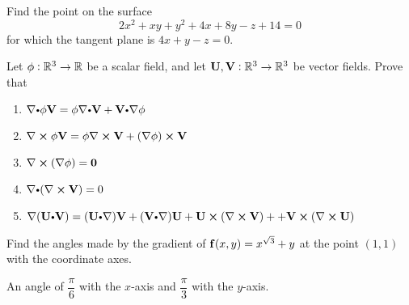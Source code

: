 \begin{multicols}{2}
\begin{problem}
\end{problem}
\begin{problem}
Find the point on the surface  $$2x^2+xy+y^2+4x+8y-z+14=0$$ for
which the tangent plane is  $4x+y-z=0$.
\end{problem}
\begin{problem}
Let $\phi:\mathbb{R}^3\to \mathbb{R}$ be a scalar field, and let ${\mathbf U},
{\mathbf V}:\mathbb{R}^3\to \mathbb{R}^3$ be vector fields. Prove that
\begin{enumerate}
\item $\nabla \bp \phi\point{V}=\phi\nabla\bp \point{V}+\point{V}\bp\nabla\phi$
\item $\nabla \boldsymbol\times \phi{\mathbf V}=\phi\nabla\boldsymbol\times {\mathbf V}+(\nabla\phi)\boldsymbol\times {\mathbf V}$
\item $\nabla \boldsymbol\times (\nabla \phi)=\mathbf{ 0}$
\item $\nabla \bp (\nabla \cross \point{V})=0$
\item $\nabla (\point{U}\bp \point{V})=  (\point{U}\bp \nabla)\point{V}+(\point{V}\bp \nabla)\point{U} +\point{U}\cross (\nabla \cross\point{V})
++\point{V}\cross (\nabla \cross\point{U})$
\end{enumerate}
\end{problem}
\begin{problem}
Find the angles made by the gradient of $\mathbf{ f}(x,y)=x^{\sqrt{3}}+y$ at
the point $(1,1)$ with the coordinate axes.
\begin{answer}
An angle of $ \dfrac{\pi}{6}$ with the $x$-axis and $
\dfrac{\pi}{3}$ with the $y$-axis.
\end{answer}
\end{problem}

\end{multicols}


